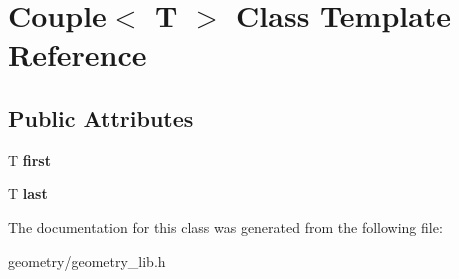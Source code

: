 \hypertarget{class_couple}{}\section{Couple$<$ T $>$ Class Template Reference}
\label{class_couple}
\subsection*{Public Attributes}
\begin{DoxyCompactItemize}
\item 
\mbox{\label{class_couple_a639e692ad6f62188103f63226f6fdf58}} 
T {\bfseries first}
\item 
\mbox{\label{class_couple_a5d88c738173b2e060df4e702f83e8ca5}} 
T {\bfseries last}
\end{DoxyCompactItemize}


The documentation for this class was generated from the following file\+:\begin{DoxyCompactItemize}
\item 
geometry/geometry\+\_\+lib.\+h\end{DoxyCompactItemize}
